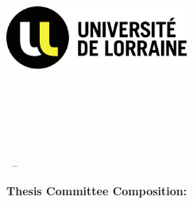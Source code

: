 \begin{titlepage}
    \begin{addmargin}[-1cm]{-3cm}
    \begin{center}
        \large  

        \hfill

        \vfill

        \begingroup
            \color{mypurple}\spacedallcaps{\myTitle} \\ \bigskip
        \endgroup

        \spacedlowsmallcaps{\myName}

        \vfill

        \includegraphics[width=6cm]{Assets/logo-ul.png} \\ \medskip

        \mySubtitle \\ \medskip   
        \myDepartment \\                            
        \myFaculty \\
        \myUni \\ \bigskip

        \myTime\ -- \myVersion

        \vfill
        
        \end{center}


        \vspace{1em}
        {\large\textbf{Thesis Committee Composition:}}


\end{addmargin}
\end{titlepage}
